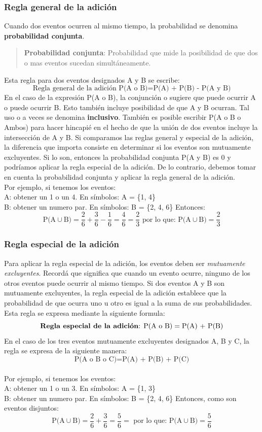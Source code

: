 \documentclass[]{article}
\begin{document}
\subsubsection*{Regla general de la adición}
Cuando dos eventos ocurren al mismo tiempo, la probabilidad se denomina \textbf{probabilidad conjunta}.
\begin{quote}
	\textbf{Probabilidad conjunta}: Probabilidad que mide la posibilidad de que dos o mas eventos sucedan simultáneamente.
\end{quote}
Esta regla para dos eventos designados A y B se escribe:
\[ \text{Regla general de la  adición } \text{P(A o B)} = \text{P(A) + P(B) - P(A y B)}\]
En el caso de la expresión P(A o B), la conjunción o sugiere que puede ocurrir A o puede ocurrir B. Esto también incluye posibilidad de que A y B ocurran. Tal uso o a veces se denomina \textbf{inclusivo}. También es posible escribir P(A o B o Ambos) para hacer hincapié en el hecho de que la unión de dos eventos incluye la intersección de A y B. Si comparamos las reglas general y especial de la adición, la diferencia que importa consiste en determinar si los eventos son mutuamente excluyentes. Si lo son, entonces la probabilidad conjunta P(A y B) es 0 y podríamos aplicar la regla especial de la adición. De lo contrario, debemos tomar en cuenta la probabilidad conjunta y aplicar la regla general de la adición.
\\Por ejemplo, si tenemos los eventos:\\
A: obtener un 1 o un 4. En símbolos: A = \{1, 4\} \\
B: obtener un numero par. En símbolos: B = \{2, 4, 6\}
Entonces:\\
\[ \text{P(A} \cup \text{B)} = \frac{2}{6} + \frac{3}{6} - \frac{1}{6} = \frac{4}{6} = \frac{2}{3} \text{ por lo que: } \text{P(A} \cup \text{B)} = \frac{2}{3}
\]

\subsubsection*{Regla especial de la adición}
Para aplicar la regla especial de la adición, los eventos deben ser \textit{mutuamente excluyentes}. Recordá que significa que cuando un evento ocurre, ninguno de los otros eventos puede ocurrir al mismo tiempo. Si dos eventos A y B son mutuamente excluyentes, la regla especial de la adición establece que la probabilidad de que ocurra uno u otro es igual a la suma de sus probabilidades. Esta regla se expresa mediante la siguiente formula:
\[ \text{\textbf{Regla especial de la adición}: }\text{P(A o B)} = \text{P(A) + P(B)}\]
En el caso de los tres eventos mutuamente excluyentes designados A, B y C, la regla se expresa de la siguiente manera:
\[ \text{P(A o B o C)} = \text{P(A) + P(B) + P(C)} \]
\\Por ejemplo, si tenemos los eventos:\\
A: obtener un 1 o un 3. En símbolos: A = \{1, 3\} \\
B: obtener un numero par. En símbolos: B = \{2, 4, 6\}
Entonces, como son eventos disjuntos:\\
\[ \text{P(A} \cup \text{B)} = \frac{2}{6} + \frac{3}{6} = \frac{5}{6} = \text{ por lo que: } \text{P(A} \cup \text{B)} = \frac{5}{6}
\]
\end{document}
